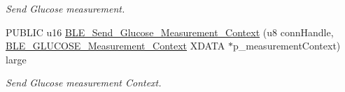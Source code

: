 \begin{DoxyCompactItemize}
\begin{DoxyCompactList}\small\item\em Send Glucose measurement. \end{DoxyCompactList}\item 
P\+U\+B\+L\+IC u16 \hyperlink{group___b_l_e___g_s_gad42f4fb74c6efd69041abc079d0e6705}{B\+L\+E\+\_\+\+Send\+\_\+\+Glucose\+\_\+\+Measurement\+\_\+\+Context} (u8 conn\+Handle, \hyperlink{struct_b_l_e___g_l_u_c_o_s_e___measurement___context}{B\+L\+E\+\_\+\+G\+L\+U\+C\+O\+S\+E\+\_\+\+Measurement\+\_\+\+Context} X\+D\+A\+TA $\ast$p\+\_\+measurement\+Context) large
\begin{DoxyCompactList}\small\item\em Send Glucose measurement Context. \end{DoxyCompactList}\end{DoxyCompactItemize}
